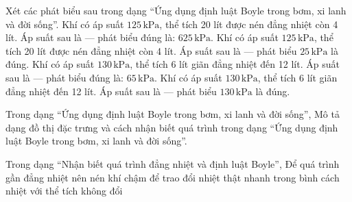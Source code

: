 \begin{ex}
Xét các phát biểu sau trong dạng “Ứng dụng định luật Boyle trong bơm, xi lanh và đời sống”.
\choiceTF
{\True Khí có áp suất $125\,\text{kPa}$, thể tích 20 lít được nén đẳng nhiệt còn 4 lít. Áp suất sau là — phát biểu đúng là: $625\,\text{kPa}$.}
{Khí có áp suất $125\,\text{kPa}$, thể tích 20 lít được nén đẳng nhiệt còn 4 lít. Áp suất sau là — phát biểu $25\,\text{kPa}$ là đúng.}
{\True Khí có áp suất $130\,\text{kPa}$, thể tích 6 lít giãn đẳng nhiệt đến 12 lít. Áp suất sau là — phát biểu đúng là: $65\,\text{kPa}$.}
{Khí có áp suất $130\,\text{kPa}$, thể tích 6 lít giãn đẳng nhiệt đến 12 lít. Áp suất sau là — phát biểu $130\,\text{kPa}$ là đúng.}
\end{ex}

\begin{ex}
Trong dạng “Ứng dụng định luật Boyle trong bơm, xi lanh và đời sống”, Mô tả dạng đồ thị đặc trưng và cách nhận biết quá trình trong dạng “Ứng dụng định luật Boyle trong bơm, xi lanh và đời sống”.
\choiceTF

\end{ex}

\begin{ex}
Trong dạng “Nhận biết quá trình đẳng nhiệt và định luật Boyle”, Để quá trình gần đẳng nhiệt nên nén khí
\choice
{\True chậm để trao đổi nhiệt}
{thật nhanh}
{trong bình cách nhiệt}
{với thể tích không đổi}
\end{ex}

